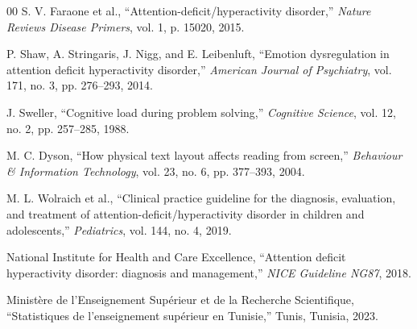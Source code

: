 \documentclass[conference]{IEEEtran}
\begin{document}
\begin{thebibliography}{00}
S. V. Faraone et al., ``Attention-deficit/hyperactivity disorder,'' \textit{Nature Reviews Disease Primers}, vol. 1, p. 15020, 2015.

P. Shaw, A. Stringaris, J. Nigg, and E. Leibenluft, ``Emotion dysregulation in attention deficit hyperactivity disorder,'' \textit{American Journal of Psychiatry}, vol. 171, no. 3, pp. 276--293, 2014.

J. Sweller, ``Cognitive load during problem solving,'' \textit{Cognitive Science}, vol. 12, no. 2, pp. 257--285, 1988.

M. C. Dyson, ``How physical text layout affects reading from screen,'' \textit{Behaviour \& Information Technology}, vol. 23, no. 6, pp. 377--393, 2004.

M. L. Wolraich et al., ``Clinical practice guideline for the diagnosis, evaluation, and treatment of attention-deficit/hyperactivity disorder in children and adolescents,'' \textit{Pediatrics}, vol. 144, no. 4, 2019.

National Institute for Health and Care Excellence, ``Attention deficit hyperactivity disorder: diagnosis and management,'' \textit{NICE Guideline NG87}, 2018.

Ministère de l'Enseignement Supérieur et de la Recherche Scientifique, ``Statistiques de l'enseignement supérieur en Tunisie,'' Tunis, Tunisia, 2023.

\end{thebibliography}
\end{document}
